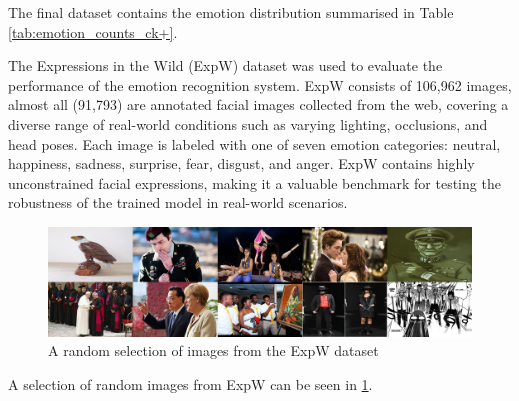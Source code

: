 The final dataset contains the emotion distribution summarised in Table \ref{tab:emotion_counts_ck+}.


The Expressions in the Wild (ExpW) dataset was used to evaluate the performance of the emotion recognition system. ExpW consists of 106,962 images, almost all (91,793) are annotated facial images collected from the web, covering a diverse range of real-world conditions such as varying lighting, occlusions, and head poses. Each image is labeled with one of seven emotion categories: neutral, happiness, sadness, surprise, fear, disgust, and anger. ExpW contains highly unconstrained facial expressions, making it a valuable benchmark for testing the robustness of the trained model in real-world scenarios.

\begin{figure}[!htb]
    \centering{}
    \includegraphics[scale=0.18]{m+m_images/exp_w_sample.jpg}
    \caption{A random selection of images from the ExpW dataset}
    \label{figure:exp_w_sample}
\end{figure}

A selection of random images from ExpW can be seen in \ref{figure:exp_w_sample}.


